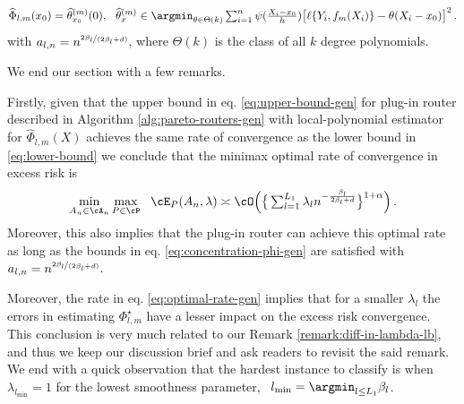 \begin{theorem}
\begin{itemize}
    \begin{equation}\label{LPR-gen}
    \widehat \Phi_{l, m}(x_0) = \widehat\theta_{x_0}^{(m)}(0), ~~ \widehat \theta_x^{(m)} \in \argmin_{\theta \in \Theta(k)}  \textstyle \sum_{i = 1}^n \psi (\frac{X_i - x_0}{h}) \big [\ell \{Y_i, f_m(X_i)\} - \theta (X_i -x_0 )\big]^2 \,. 
\end{equation}
    with $a_{l, n} = n^{\nicefrac{2\beta_l}{(2\beta_l + d)}}$, where $\Theta(k)$ is the class of all $k$ degree polynomials. 
\end{itemize} 

  
\end{theorem}
We end our section with a few remarks. 

\begin{remark}

Firstly, given that the upper bound in eq.  \eqref{eq:upper-bound-gen} for plug-in router described in Algorithm \ref{alg:pareto-routers-gen} with local-polynomial estimator for $\widehat \Phi_{l, m}(X)$ achieves the same rate of convergence as the lower bound in \eqref{eq:lower-bound} we conclude that the minimax optimal rate of convergence in excess risk is 
\begin{equation} \label{eq:optimal-rate-gen}
    \textstyle \min\limits_{A_n \in \cA_n} \max\limits_{P \in \cP} ~~ \cE_P(A_n, \lambda) \asymp \cO \Big(\big \{\sum_{l = 1}^{L_1}\lambda_l n^{- \frac{\beta_l}{2\beta_l + d}}\big\}^{1+\alpha}\Big)\,. 
\end{equation} Moreover, this also implies that the plug-in router can achieve this optimal rate as long as the bounds in eq. \eqref{eq:concentration-phi-gen} are satisfied with $a_{l, n} = n^{\nicefrac{2\beta_l}{(2\beta_l + d)}}$. 
    
\end{remark}

\begin{remark}
Moreover, the rate in eq. \eqref{eq:optimal-rate-gen} implies that for a smaller $\lambda_l$ the errors in estimating $\Phi_{l, m}^\star$ have a lesser impact on the excess risk convergence. This conclusion is very much related to our Remark \ref{remark:diff-in-lambda-lb}, and thus we keep our discussion brief and ask readers to revisit the said remark. We end with a quick observation that the hardest instance to classify is when $\lambda_{l_{\min}} = 1$ for the lowest smoothness parameter, \ie\ $l_{\min} = \argmin_{l \le L_1} \beta_l$. 

    
\end{remark}


